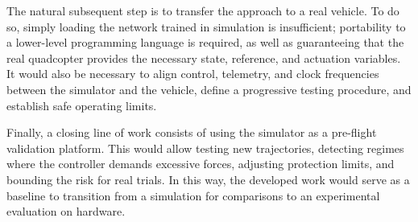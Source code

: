 The natural subsequent step is to transfer the approach to a real vehicle. To do so, simply loading the network trained in simulation is insufficient; portability to a lower-level programming language is required, as well as guaranteeing that the real quadcopter provides the necessary state, reference, and actuation variables. It would also be necessary to align control, telemetry, and clock frequencies between the simulator and the vehicle, define a progressive testing procedure, and establish safe operating limits.

Finally, a closing line of work consists of using the simulator as a pre-flight validation platform. This would allow testing new trajectories, detecting regimes where the controller demands excessive forces, adjusting protection limits, and bounding the risk for real trials. In this way, the developed work would serve as a baseline to transition from a simulation for comparisons to an experimental evaluation on hardware.
